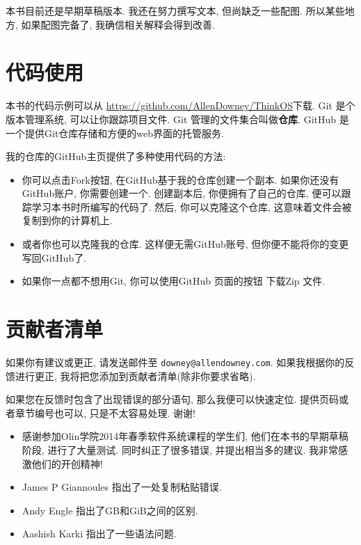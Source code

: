 \documentclass[12pt]{book}
\begin{document}
本书目前还是早期草稿版本. 
我还在努力撰写文本, 但尚缺乏一些配图.
所以某些地方, 如果配图完备了, 我确信相关解释会得到改善.


\section{代码使用}
\label{code}

本书的代码示例可以从
\url{https://github.com/AllenDowney/ThinkOS}下载.  
Git 是个版本管理系统, 可以让你跟踪项目文件. 
Git 管理的文件集合叫做{\bf 仓库}.
GitHub 是一个提供Git仓库存储和方便的web界面的托管服务.

我的仓库的GitHub主页提供了多种使用代码的方法:

\begin{itemize}

\item 你可以点击{\sf Fork}按钮, 在GitHub基于我的仓库创建一个副本.
如果你还没有GitHub账户, 你需要创建一个.
创建副本后, 你便拥有了自己的仓库, 便可以跟踪学习本书时所编写的代码了.
然后, 你可以克隆这个仓库, 这意味着文件会被复制到你的计算机上.

\item 或者你也可以克隆我的仓库. 这样便无需GitHub账号,
但你便不能将你的变更写回GitHub了.

\item 如果你一点都不想用Git, 你可以使用GitHub
页面的按钮
下载Zip 文件.

\end{itemize}


\section*{贡献者清单}


如果你有建议或更正, 请发送邮件至 
{\tt downey@allendowney.com}.  
如果我根据你的反馈进行更正,
我将把您添加到贡献者清单(除非你要求省略).

如果您在反馈时包含了出现错误的部分语句,
那么我便可以快速定位.
提供页码或者章节编号也可以, 只是不太容易处理.
谢谢!

\small

\begin{itemize}

\item 感谢参加Olin学院2014年春季软件系统课程的学生们,
他们在本书的早期草稿阶段, 进行了大量测试.
同时纠正了很多错误, 并提出相当多的建议. 
我非常感激他们的开创精神!

\item James P Giannoules 指出了一处复制粘贴错误.

\item Andy Engle 指出了GB和GiB之间的区别.

\item Aashish Karki 指出了一些语法问题.


\end{itemize}
\end{document}
